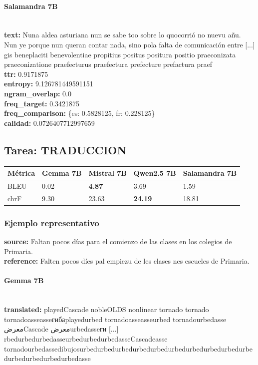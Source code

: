 \paragraph{Salamandra 7B}~\\
\textbf{text:} Nuna aldea asturiana nun se sabe too sobre lo qu\textquotesingle{}ocorrió no nuevu añu. Nun ye porque nun queran contar nada, sino pola falta de comunicación entre [...] gis beneplaciti benevolentiae propitius positus positura positio praeconizata praeconizatione praefecturus praefectura prefecture prefactura praef\\
\textbf{ttr:} 0.9171875\\
\textbf{entropy:} 9.126781449591151\\
\textbf{ngram\_overlap:} 0.0\\
\textbf{freq\_target:} 0.3421875\\
\textbf{freq\_comparison:} \{\textquotesingle{}es\textquotesingle{}: 0.5828125, \textquotesingle{}fr\textquotesingle{}: 0.228125\}\\
\textbf{calidad:} 0.0726407712997659\\

\subsection{Tarea: TRADUCCION}\label{tarea-traduccion}
{\def\LTcaptype{none}
\begin{longtable}[]{@{}lllll@{}}
\toprule\noalign{}
Métrica & Gemma 7B & Mistral 7B & Qwen2.5 7B & Salamandra 7B \\
\midrule\noalign{}
\endhead
\bottomrule\noalign{}
\endlastfoot
BLEU & 0.02 & \textbf{4.87} & 3.69 & 1.59 \\
chrF & 9.30 & 23.63 & \textbf{24.19} & 18.81 \\
\end{longtable}}

\subsubsection{Ejemplo representativo}
\textbf{source:} Faltan pocos días para el comienzo de las clases en los colegios de Primaria.\\
\textbf{reference:} Falten pocos díes pal empiezu de les clases nes escueles de Primaria.\\

\paragraph{Gemma 7B}~\\
\textbf{translated:} playedCascade nobleOLDS nonlinear tornado tornado tornadoasseasseгибаplayedurbed tornadoasseasseurbed tornadourbedasse معرضCascade معرضurbedasseги [...] rbedurbedurbedasseurbedurbedurbedasseCascadeasse tornadourbedassedibujosurbedurbedurbedurbedurbedurbedurbedurbedurbedurbedurbedurbedurbedurbedasse\\

